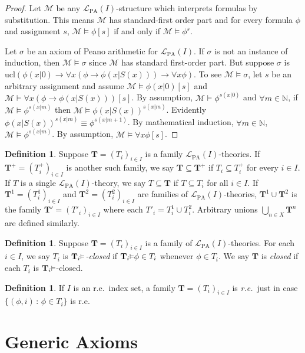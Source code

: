 \documentclass[reqno]{article}
\theoremstyle{definition}
\newtheorem{definition}[theorem]{Definition}
\def\N{\mathbb{N}}
\def\L{\mathscr{L}}
\def\M{\mathscr{M}}
\def\T{\mathbf{T}}
\def\LPA{\L_{\mathrm{PA}}}
\renewcommand{\Pr}[1]{\T_{#1}\mbox{\small${\vDash}$}}
\newcommand{\ucl}[1]{\mathrm{ucl}(#1)}
\begin{document}
\begin{proof}
Let $\M$ be any $\LPA(I)$-structure which interprets formulas by substitution.
This means $\M$ has standard-first order part and for every formula $\phi$
and assignment $s$,
$\M\models \phi[s]$ if and only if $\M\models\phi^s$.

Let $\sigma$ be an axiom of Peano arithmetic for $\LPA(I)$.  If $\sigma$ is not an instance
of induction, then $\M\models\sigma$ since $\M$ has standard first-order part.
But suppose $\sigma$ is $\ucl{\phi(x|0)\rightarrow \forall x(\phi\rightarrow\phi(x|S(x)))\rightarrow\forall x\phi}$.
To see $\M\models\sigma$, let $s$ be an arbitrary assignment and assume
$\M\models\phi(x|0)[s]$ and $\M\models\forall x(\phi\rightarrow \phi(x|S(x)))[s]$.
By assumption, $\M\models\phi^{s(x|0)}$ and $\forall m\in\N$,
if $\M\models \phi^{s(x|m)}$ then $\M\models \phi(x|S(x))^{s(x|m)}$.
Evidently $\phi(x|S(x))^{s(x|m)}\equiv\phi^{s(x|m+1)}$.
By mathematical induction, $\forall m\in\N$, $\M\models\phi^{s(x|m)}$.
By assumption, $\M\models \forall x\phi[s]$.
\end{proof}


\begin{definition}
Suppose $\T=(T_i)_{i\in I}$ is a family $\LPA(I)$-theories.
If $\T^+=(T^+_i)_{i\in I}$ is another such family, we say $\T\subseteq\T^+$
if $T_i\subseteq T^+_i$ for every $i\in I$.
If $T$ is a single $\LPA(I)$-theory,
we say $T\subseteq\T$ if $T\subseteq T_i$ for all $i\in I$.
If $\T^1=(T^1_i)_{i\in I}$ and $\T^2=(T^2_i)_{i\in I}$
are families of $\LPA(I)$-theories, $\T^1\cup\T^2$
is the family $\T'=(T'_i)_{i\in I}$ where each $T'_i=T^1_i\cup T^2_i$.
Arbitrary unions $\bigcup_{n\in X}\T^n$ are defined similarly.
\end{definition}


\begin{definition}
Suppose $\T=(T_i)_{i\in I}$ is a family of $\LPA(I)$-theories.
For each $i\in I$, we say $T_i$ is \emph{$\Pr i$-closed} if
$\Pr i\phi\in T_i$ whenever $\phi\in T_i$.
We say $\T$ is \emph{closed} if each $T_i$ is $\Pr i$-closed.
\end{definition}

\begin{definition}
If $I$ is an r.e.~index set, a family $\T=(T_i)_{i\in I}$ is \emph{r.e.}~just in case
$\{(\phi,i)\,:\,\phi\in T_i\}$ is r.e.
\end{definition}

\section{Generic Axioms}
\end{document}
